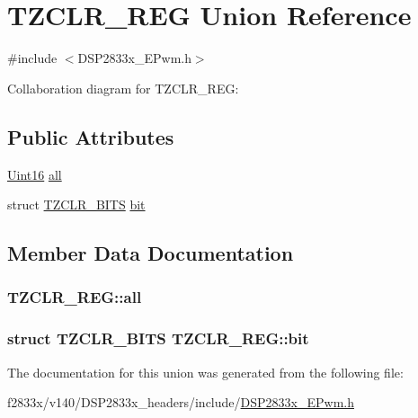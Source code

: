 \hypertarget{union_t_z_c_l_r___r_e_g}{}\section{T\+Z\+C\+L\+R\+\_\+\+R\+E\+G Union Reference}
\label{union_t_z_c_l_r___r_e_g}


{\ttfamily \#include $<$D\+S\+P2833x\+\_\+\+E\+Pwm.\+h$>$}



Collaboration diagram for T\+Z\+C\+L\+R\+\_\+\+R\+E\+G\+:
\subsection*{Public Attributes}
\begin{DoxyCompactItemize}
\item 
\hyperlink{_d_s_p2833x___device_8h_a59a9f6be4562c327cbfb4f7e8e18f08b}{Uint16} \hyperlink{union_t_z_c_l_r___r_e_g_afc7496aa5792f961d0ea287749583d30}{all}
\item 
struct \hyperlink{struct_t_z_c_l_r___b_i_t_s}{T\+Z\+C\+L\+R\+\_\+\+B\+I\+T\+S} \hyperlink{union_t_z_c_l_r___r_e_g_aebe7ea2b8dc74bcf62d441559a970029}{bit}
\end{DoxyCompactItemize}


\subsection{Member Data Documentation}
\hypertarget{union_t_z_c_l_r___r_e_g_afc7496aa5792f961d0ea287749583d30}{}
\subsubsection[{all}]{ T\+Z\+C\+L\+R\+\_\+\+R\+E\+G\+::all}\label{union_t_z_c_l_r___r_e_g_afc7496aa5792f961d0ea287749583d30}
\hypertarget{union_t_z_c_l_r___r_e_g_aebe7ea2b8dc74bcf62d441559a970029}{}
\subsubsection[{bit}]{\setlength{\rightskip}{0pt plus 5cm}struct {\bf T\+Z\+C\+L\+R\+\_\+\+B\+I\+T\+S} T\+Z\+C\+L\+R\+\_\+\+R\+E\+G\+::bit}\label{union_t_z_c_l_r___r_e_g_aebe7ea2b8dc74bcf62d441559a970029}


The documentation for this union was generated from the following file\+:\begin{DoxyCompactItemize}
\item 
f2833x/v140/\+D\+S\+P2833x\+\_\+headers/include/\hyperlink{_d_s_p2833x___e_pwm_8h}{D\+S\+P2833x\+\_\+\+E\+Pwm.\+h}\end{DoxyCompactItemize}

